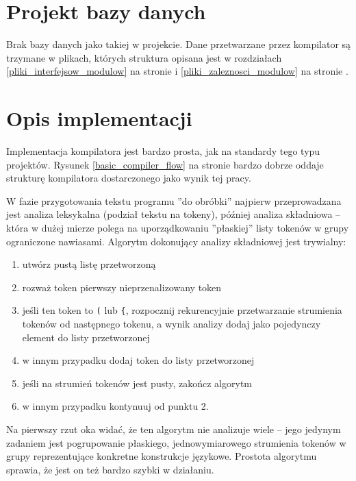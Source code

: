 \documentclass[11pt,oneside,a4paper,titlepage,onecolumn]{article}
\begin{document}
\newpage
\section{Projekt bazy danych}

Brak bazy danych jako takiej w projekcie.
Dane przetwarzane przez kompilator są trzymane w plikach, których struktura opisana jest w rozdziałach
\ref{pliki_interfejsow_modulow} na stronie \pageref{pliki_interfejsow_modulow} i
\ref{pliki_zaleznosci_modulow} na stronie \pageref{pliki_zaleznosci_modulow}.

\section{Opis implementacji}

Implementacja kompilatora jest bardzo prosta, jak na standardy tego typu projektów.
Rysunek \ref{basic_compiler_flow} na stronie \pageref{basic_compiler_flow} bardzo dobrze oddaje strukturę
kompilatora dostarczonego jako wynik tej pracy.

W fazie przygotowania tekstu programu ''do obróbki'' najpierw przeprowadzana jest analiza leksykalna (podział
tekstu na tokeny), później analiza składniowa -- która w dużej mierze polega na uporządkowaniu ''płaskiej''
listy tokenów w grupy ograniczone nawiasami. Algorytm dokonujący analizy składniowej jest trywialny:

\begin{enumerate}
    \item utwórz pustą listę przetworzoną
    \item rozważ token pierwszy nieprzenalizowany token
    \item jeśli ten token to \texttt{(} lub \texttt{\{}, rozpocznij rekurencyjnie przetwarzanie strumienia
        tokenów od następnego tokenu, a wynik analizy dodaj jako pojedynczy element do listy przetworzonej
    \item w innym przypadku dodaj token do listy przetworzonej
    \item jeśli na strumień tokenów jest pusty, zakończ algorytm
    \item w innym przypadku kontynuuj od punktu 2.
\end{enumerate}

Na pierwszy rzut oka widać, że ten algorytm nie analizuje wiele -- jego jedynym zadaniem jest pogrupowanie
płaskiego, jednowymiarowego strumienia tokenów w grupy reprezentujące konkretne konstrukcje językowe. Prostota
algorytmu sprawia, że jest on też bardzo szybki w działaniu.
\end{document}
